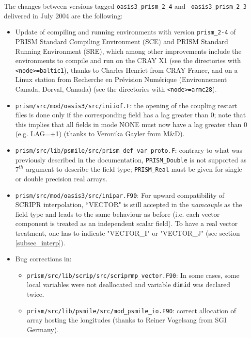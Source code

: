   The changes between versions tagged {\tt oasis3\_prism\_2\_4} and {\tt
    oasis3\_prism\_2\_3} delivered in July 2004 are the following:

\begin{itemize}

\item Update of compiling and running environments with version
  \texttt{prism\_2-4} of PRISM Standard Compiling Environment (SCE) and
  PRISM Standard Running Environment (SRE), which among other
  improvements include the environments to compile and run on the CRAY
  X1 (see the directories with \texttt{<node>=baltic1}), thanks to
  Charles Henriet from CRAY France, and on a Linux station from
  Recherche en Pr\'evision Num\'erique (Environnement Canada, Dorval,
  Canada) (see the directories with \texttt{<node>=armc28}).

\item \texttt{prism/src/mod/oasis3/src/iniiof.F}: the opening of the
  coupling restart files is done only if the corresponding field has a
  lag greater than 0; note that this implies that all fields in mode
  NONE must now have a lag greater than 0 (e.g. LAG=+1) (thanks to
  Veronika Gayler from M\&D).

\item \texttt{prism/src/lib/psmile/src/prism\_def\_var\_proto.F}:
 contrary to what was previously described in the documentation,
 \texttt{PRISM\_Double} is not supported as $7^{th}$ argument to
 describe the field type; {\tt PRISM\_Real} must be given for single
 or double precision real arrays.

\item \texttt{prism/src/mod/oasis3/src/inipar.F90}: For upward
   compatibility of SCRIPR interpolation, ``VECTOR" is still accepted
   in the {\it namcouple} as the field type 
   and leads to the same behaviour as before (i.e. each vector
   component is treated as an independent scalar field). To have a
   real vector treatment, one has to indicate "VECTOR\_I" or "VECTOR\_J"
   (see section \ref{subsec_interp}).

\item Bug corrections in: 
\begin{itemize}

\item \texttt{prism/src/lib/scrip/src/scriprmp\_vector.F90}: In some
 cases, some local variables were not deallocated and variable
 \texttt{dimid} was declared twice.

\item 
\texttt{prism/src/lib/psmile/src/mod\_psmile\_io.F90}: correct
allocation of array hosting the longitudes (thanks to Reiner Vogelsang
from SGI Germany).


\end{itemize}
\end{itemize}
